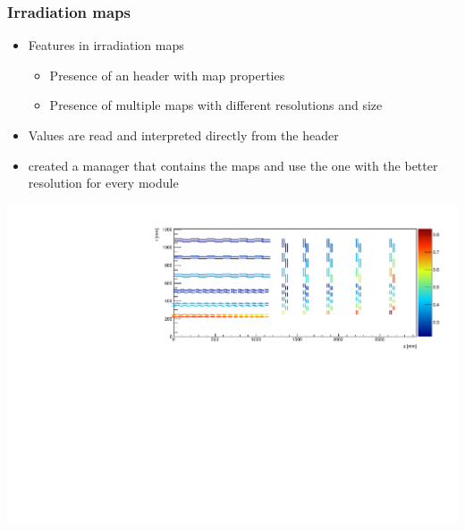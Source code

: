 \documentclass[pdftex, 11pt]{beamer}
\begin{document}
\begin{frame}
  \frametitle{Irradiation maps}
  \begin{itemize}
  \item \alert{Features} in irradiation maps
    \pause
    \begin{itemize}
    \item Presence of an \alert{header} with map properties
      \pause
    \item Presence of \alert{multiple maps} with different resolutions
      and size
    \end{itemize}
    \pause
  \item Values are \alert{read} and interpreted directly from the header
    \pause
  \item created a \alert{manager} that \alert{contains} the maps and use the one
    with the better resolution for every module
  \end{itemize}
   {
    \includegraphics[width=\textwidth-0.5cm]{img/irradiation.pdf}
  }
\end{frame}
\end{document}
